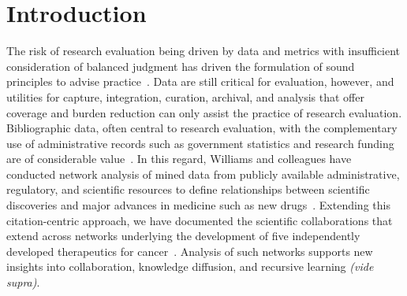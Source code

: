 \documentclass[review]{elsarticle}
\begin{document}
\linenumbers
\raggedright

\section*{Introduction}

The risk of research evaluation being driven by data and metrics with insufficient consideration of balanced judgment has driven the formulation of  sound principles to advise practice~\cite{LeidenManifesto2015}. Data are still critical for evaluation, however, and utilities for capture, integration, curation, archival, and analysis that offer coverage and burden reduction can only assist the practice of research evaluation. Bibliographic data, often central to research evaluation, with the complementary use of administrative records such as government statistics and research funding are of considerable value~\cite{FedStat2017}. In this regard, Williams and colleagues have conducted network analysis of mined data from publicly available administrative, regulatory, and scientific resources to define relationships between scientific discoveries and major advances in medicine such as new drugs~\cite{Williams2015}. Extending this citation-centric approach, we have documented the scientific collaborations that extend across networks underlying the development of five independently developed therapeutics for cancer~\cite{Keserci2017}. Analysis of such networks supports new insights into collaboration, knowledge diffusion, and recursive learning \textit{(vide supra)}. 
\end{document}
